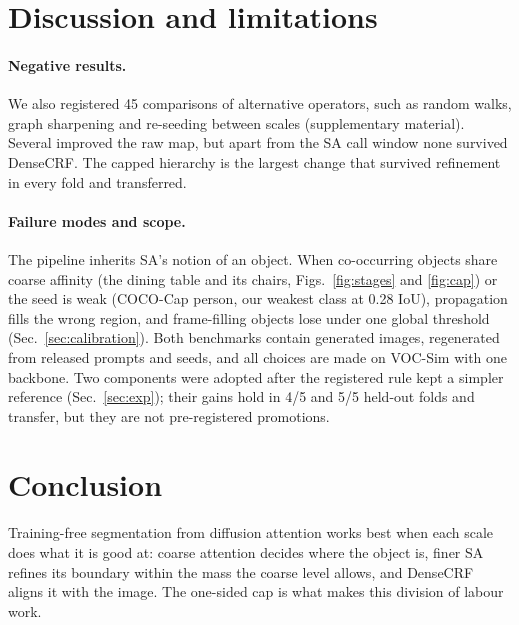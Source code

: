\section{Discussion and limitations}
\label{sec:discussion}
\paragraph{Negative results.}
We also registered 45 comparisons of alternative operators, such as random walks, graph sharpening and re-seeding between scales (supplementary material). Several improved the raw map, but apart from the SA call window none survived DenseCRF. The capped hierarchy is the largest change that survived refinement in every fold and transferred.

\paragraph{Failure modes and scope.}
The pipeline inherits SA's notion of an object. When co-occurring objects share coarse affinity (the dining table and its chairs, Figs.~\ref{fig:stages} and \ref{fig:cap}) or the seed is weak (COCO-Cap person, our weakest class at 0.28 IoU), propagation fills the wrong region, and frame-filling objects lose under one global threshold (Sec.~\ref{sec:calibration}). Both benchmarks contain generated images, regenerated from released prompts and seeds, and all choices are made on VOC-Sim with one backbone. Two components were adopted after the registered rule kept a simpler reference (Sec.~\ref{sec:exp}); their gains hold in 4/5 and 5/5 held-out folds and transfer, but they are not pre-registered promotions.

\section{Conclusion}
Training-free segmentation from diffusion attention works best when each scale does what it is good at: coarse attention decides where the object is, finer SA refines its boundary within the mass the coarse level allows, and DenseCRF aligns it with the image. The one-sided cap is what makes this division of labour work.
